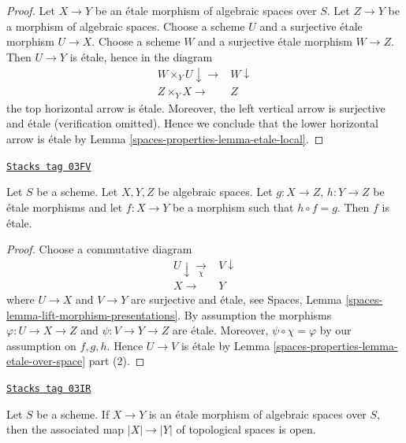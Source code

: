 \begin{proof}
Let $X \to Y$ be an \'etale morphism of algebraic spaces over $S$.
Let $Z \to Y$ be a morphism of algebraic spaces.
Choose a scheme $U$ and a surjective \'etale morphism $U \to X$.
Choose a scheme $W$ and a surjective \'etale morphism $W \to Z$.
Then $U \to Y$ is \'etale, hence in the diagram
$$
\begin{array}{cc}W \times_Y U \downarrow\longrightarrow & W \downarrow \\ Z \times_Y X \longrightarrow & Z\end{array}
$$
the top horizontal arrow is \'etale.
Moreover, the left vertical arrow is surjective
and \'etale (verification omitted). Hence we conclude that the lower
horizontal arrow is \'etale by Lemma \ref{spaces-properties-lemma-etale-local}.
\end{proof}

\begin{lemma}
\label{spaces-properties-lemma-etale-permanence}
\href{https://stacks.math.columbia.edu/tag/03FV}{\texttt{Stacks tag 03FV}}

Let $S$ be a scheme. Let $X, Y, Z$ be algebraic spaces.
Let $g : X \to Z$, $h : Y \to Z$ be \'etale morphisms and let
$f : X \to Y$ be a morphism such that $h \circ f = g$.
Then $f$ is \'etale.
\end{lemma}

\begin{proof}
Choose a commutative diagram
$$
\begin{array}{cc}U \downarrow\underset{\chi}{\longrightarrow} & V \downarrow \\ X \longrightarrow & Y\end{array}
$$
where $U \to X$ and $V \to Y$ are surjective and \'etale, see
Spaces, Lemma \ref{spaces-lemma-lift-morphism-presentations}.
By assumption the morphisms $\varphi : U \to X \to Z$ and
$\psi : V \to Y \to Z$ are \'etale. Moreover, $\psi \circ \chi = \varphi$
by our assumption on $f, g, h$.
Hence $U \to V$ is \'etale by Lemma \ref{spaces-properties-lemma-etale-over-space}
part (2).
\end{proof}

\begin{lemma}
\label{spaces-properties-lemma-etale-open}
\href{https://stacks.math.columbia.edu/tag/03IR}{\texttt{Stacks tag 03IR}}

Let $S$ be a scheme.
If $X \to Y$ is an \'etale morphism of algebraic spaces over $S$,
then the associated map $|X| \to |Y|$ of topological spaces
is open.
\end{lemma}

